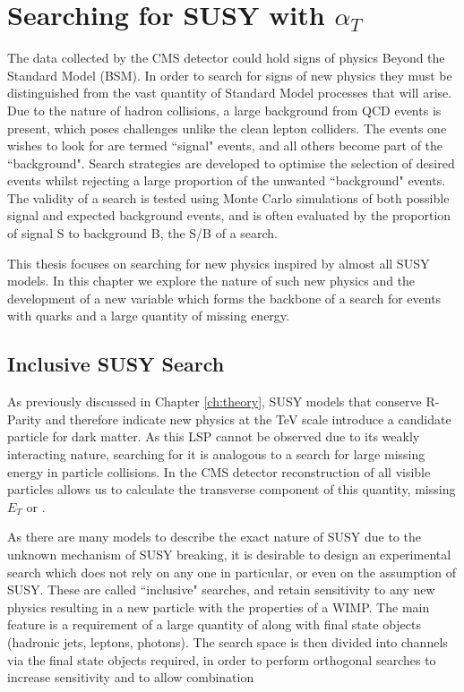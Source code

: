 \chapter{Searching for SUSY with $\alpha_{T}$}
\label{ch:at}

The data collected by the CMS detector could hold signs of physics Beyond the Standard Model (BSM). In order to search for signs of new physics they must be distinguished from the vast quantity of Standard Model processes that will arise. Due to the nature of hadron collisions, a large background from QCD events is present, which poses challenges unlike the clean lepton colliders. The events one wishes to look for are termed ``signal" events, and all others become part of the ``background". Search strategies are developed to optimise the selection of desired events whilst rejecting a large proportion of the unwanted ``background" events. The validity of a search is tested using Monte Carlo simulations of both possible signal and expected background events, and is often evaluated by the proportion of signal S to background B, the S/B of a search. 

This thesis focuses on searching for new physics inspired by almost all SUSY models. In this chapter we explore the nature of such new physics and the development of a new variable \alt which forms the backbone of a search for events with quarks and a large quantity of missing energy. 

\section{Inclusive SUSY Search}

As previously discussed in Chapter \ref{ch:theory}, SUSY models that conserve R-Parity and therefore indicate new physics at the TeV scale introduce a candidate particle for dark matter. As this LSP cannot be observed due to its weakly interacting nature, searching for it is analogous to a search for large missing energy in particle collisions. In the CMS detector reconstruction of all visible particles allows us to calculate the transverse component of this quantity, missing $E_{T}$ or \met. 

As there are many models to describe the exact nature of SUSY due to the unknown mechanism of SUSY breaking, it is desirable to design an experimental search which does not rely on any one in particular, or even on the assumption of SUSY. These are called ``inclusive" searches, and retain sensitivity to any new physics resulting in a new particle with the properties of a WIMP. The main feature is a requirement of a large quantity of \met along with final state objects (hadronic jets, leptons, photons). The search space is then divided into channels via the final state objects required, in order to perform orthogonal searches to increase sensitivity and to allow combination 

